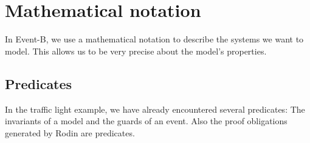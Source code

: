 \newcommand{\lascii}[1]{\qquad\quad \textrm{ASCII: } \texttt{#1}}
\newcommand{\inascii}[1]{(ASCII: \texttt{#1})}

\section{Mathematical notation}
\label{tutorial_04}
In Event-B, we use a mathematical notation to describe the systems we want to model.
This allows us to be very precise about the model's properties.

\subsection{Predicates}
\label{tut04:predicates}
In the traffic light example, we have already encountered several predicates: The invariants of
a model and the guards of an event. Also the proof obligations generated by Rodin are
predicates.


